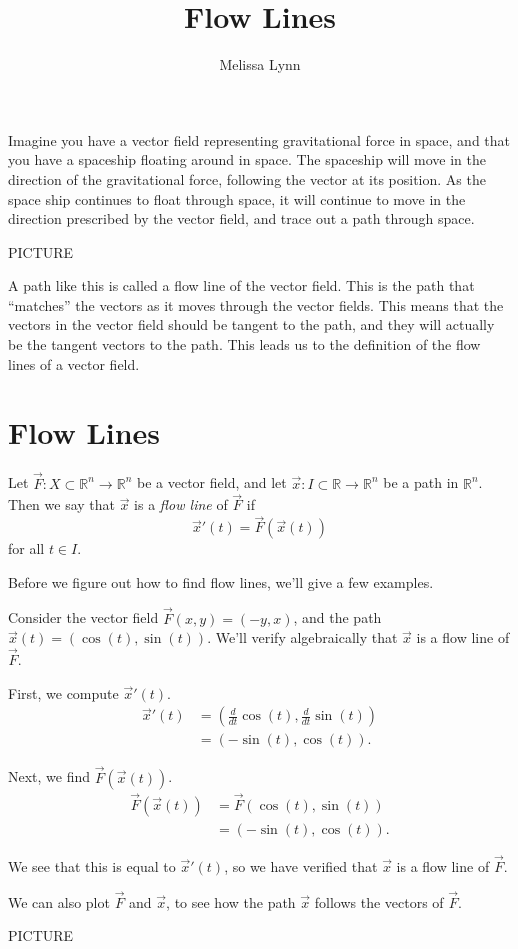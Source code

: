 \documentclass{ximera}
\title{Flow Lines}
\author{Melissa Lynn}
\begin{document}
\begin{abstract}
\end{abstract}
\maketitle

Imagine you have a vector field representing gravitational force in space, and that you have a spaceship floating around in space. The spaceship will move in the direction of the gravitational force, following the vector at its position. As the space ship continues to float through space, it will continue to move in the direction prescribed by the vector field, and trace out a path through space.

PICTURE

A path like this is called a flow line of the vector field. This is the path that ``matches'' the vectors as it moves through the vector fields. This means that the vectors in the vector field should be tangent to the path, and they will actually be the tangent vectors to the path. This leads us to the definition of the flow lines of a vector field.

\section*{Flow Lines}

\begin{definition}
Let $\vec{F}:X\subset \mathbb{R}^n\rightarrow\mathbb{R}^n$ be a vector field, and let $\vec{x}:I\subset \mathbb{R}\rightarrow\mathbb{R}^n$ be a path in $\mathbb{R}^n$. Then we say that $\vec{x}$ is a \emph{flow line} of $\vec{F}$ if 
\[
\vec{x}'(t) = \vec{F}(\vec{x}(t))
\]
for all $t\in I$.
\end{definition}

Before we figure out how to find flow lines, we'll give a few examples.

\begin{example}
Consider the vector field $\vec{F}(x,y) = (-y,x)$, and the path $\vec{x}(t) = (\cos(t),\sin(t))$. We'll verify algebraically that $\vec{x}$ is a flow line of $\vec{F}$.

First, we compute $\vec{x}'(t)$.
\begin{align*}
\vec{x}'(t) &= \left(\frac{d}{dt} \cos(t), \frac{d}{dt} \sin(t)\right)\\
& = (-\sin(t), \cos(t)).
\end{align*}

Next, we find $\vec{F}(\vec{x}(t))$.
\begin{align*}
\vec{F}(\vec{x}(t)) &= \vec{F}(\cos(t), \sin(t))\\
&= (-\sin(t),\cos(t)).
\end{align*}

We see that this is equal to $\vec{x}'(t)$, so we have verified that $\vec{x}$ is a flow line of $\vec{F}$.

We can also plot $\vec{F}$ and $\vec{x}$, to see how the path $\vec{x}$ follows the vectors of $\vec{F}$.

PICTURE
\end{example}
\end{document}
